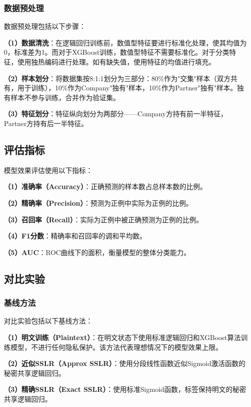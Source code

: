 \subsubsection{数据预处理}

数据预处理包括以下步骤：

\textbf{（1）数据清洗}：在逻辑回归训练前，数值型特征要进行标准化处理，使其均值为0，标准差为1。而对于XGBoost训练，数值型特征不需要标准化。对于分类特征，使用独热编码进行处理。如有缺失值，使用特征的均值进行填充。

\textbf{（2）样本划分}：将数据集按8:1:1划分为三部分：80\%作为"交集"样本（双方共有，用于训练），10\%作为Company"独有"样本，10\%作为Partner"独有"样本。独有样本不参与训练，合并作为验证集。

\textbf{（3）特征划分}：特征纵向划分为两部分——Company方持有前一半特征，Partner方持有后一半特征。

\subsection{评估指标}

模型效果评估使用以下指标：

\textbf{（1）准确率（Accuracy）}：正确预测的样本数占总样本数的比例。

\textbf{（2）精确率（Precision）}：预测为正例中实际为正例的比例。

\textbf{（3）召回率（Recall）}：实际为正例中被正确预测为正例的比例。

\textbf{（4）F1分数}：精确率和召回率的调和平均数。

\textbf{（5）AUC}：ROC曲线下的面积，衡量模型的整体分类能力。

\subsection{对比实验}

\subsubsection{基线方法}

对比实验包括以下基线方法：

\textbf{（1）明文训练（Plaintext）}：在明文状态下使用标准逻辑回归和XGBoost算法训练模型，不进行任何隐私保护。该方法代表理想情况下的模型效果上限。

\textbf{（2）近似SSLR（Approx SSLR）}：使用分段线性函数近似Sigmoid激活函数的秘密共享逻辑回归。

\textbf{（3）精确SSLR（Exact SSLR）}：使用标准Sigmoid函数，标签保持明文的秘密共享逻辑回归。

